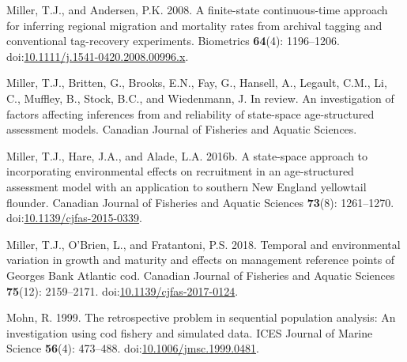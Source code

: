 \begin{CSLReferences}{1}{0}
\leavevmode{}%
Miller, T.J., and Andersen, P.K. 2008. A finite-state continuous-time approach for inferring regional migration and mortality rates from archival tagging and conventional tag-recovery experiments. Biometrics \textbf{64}(4): 1196--1206. doi:\href{https://doi.org/10.1111/j.1541-0420.2008.00996.x}{10.1111/j.1541-0420.2008.00996.x}.

\leavevmode{}%
Miller, T.J., Britten, G., Brooks, E.N., Fay, G., Hansell, A., Legault, C.M., Li, C., Muffley, B., Stock, B.C., and Wiedenmann, J. In review. An investigation of factors affecting inferences from and reliability of state-space age-structured assessment models. Canadian Journal of Fisheries and Aquatic Sciences.

\leavevmode{}%
Miller, T.J., Hare, J.A., and Alade, L.A. 2016b. A state-space approach to incorporating environmental effects on recruitment in an age-structured assessment model with an application to southern {New England} yellowtail flounder. Canadian Journal of Fisheries and Aquatic Sciences \textbf{73}(8): 1261--1270. doi:\href{https://doi.org/10.1139/cjfas-2015-0339}{10.1139/cjfas-2015-0339}.

\leavevmode{}%
\textbf{}\href{https://doi.org/10.1016/j.fishres.2016.08.002}{}\DIFaddend

\leavevmode{}%
Miller, T.J., O'Brien, L., and Fratantoni, P.S. 2018. Temporal and environmental variation in growth and maturity and effects on management reference points of {Georges Bank Atlantic} cod. Canadian Journal of Fisheries and Aquatic Sciences \textbf{75}(12): 2159--2171. doi:\href{https://doi.org/10.1139/cjfas-2017-0124}{10.1139/cjfas-2017-0124}.

\DIFdelbegin\leavevmode{}
\DIFdelend

\leavevmode{}%
Mohn, R. 1999. The retrospective problem in sequential population analysis: An investigation using cod fishery and simulated data. ICES Journal of Marine Science \textbf{56}(4): 473--488. doi:\href{https://doi.org/10.1006/jmsc.1999.0481}{10.1006/jmsc.1999.0481}.


\end{CSLReferences}
